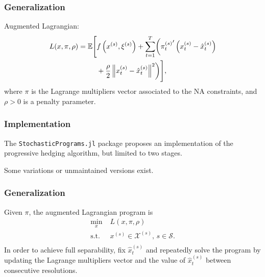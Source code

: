 \documentclass{beamer}
\begin{document}
\begin{frame}
\frametitle{Generalization}

Augmented Lagrangian:
\begin{align*}
L(x,\pi,\rho) =  {\mathbb{E}} \Biggl[ & f\left( x^{(s)}, \xi^{(s)} \right) + \sum_{t = 1}^T \biggl( {\pi_t^{(s)}}' \left(x_t^{(s)} - \hat{x}_t^{(s)}\right) \\
& + \frac{\rho}{2} \left\| x_t^{(s)} - \hat{x}_t^{(s)} \right\|^2 \biggr) \Biggr],
\end{align*}
where $\pi$ is the Lagrange multipliers vector associated to the NA constraints, and $\rho > 0$ is a penalty parameter.

\end{frame}

\begin{frame}[fragile]
\frametitle{Implementation}

The \verb|StochasticPrograms.jl| package proposes an implementation of the progressive hedging algorithm, but limited to two stages.

\mbox{}

Some variations or unmaintained versions exist.

\end{frame}

\begin{frame}
\frametitle{Generalization}

Given $\pi$, the augmented Lagrangian program is
\begin{equation}
\begin{aligned}
\min_{x} & \; L(x,\pi,\rho)\\
\text{s.t.} & \; x^{(s)} \in \mathcal{X}^{(s)}, \, s \in \mathcal{S}.\\
\end{aligned}
\label{Gen-PHA-Form}
\end{equation}
In order to achieve full separability, fix $\hat{x}_t^{(s)}$ and repeatedly solve the program by updating the Lagrange multipliers vector and the value of $\hat{x}_t^{(s)}$ between consecutive resolutions.

\end{frame}
\end{document}
